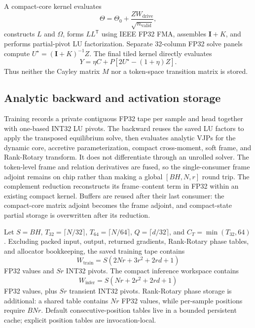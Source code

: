 \documentclass[10pt]{article}
\newcommand{\I}{\mathbf{I}}
\newcommand{\T}{\mathsf{T}}
\begin{document}
A compact-core kernel evaluates
\begin{equation}
    \Theta=\Theta_0+\frac{ZW_{\mathrm{drive}}}
                            {\sqrt{n_{\mathrm{valid}}}},
\end{equation}
constructs $L$ and $\Omega$, forms $LL^\T$ using IEEE FP32 FMA, assembles
$\I+K$, and performs partial-pivot LU factorization.  Separate 32-column FP32
solve panels compute $U^\star=(\I+K)^{-1}Z$.  The final tiled kernel directly
evaluates
\begin{equation}
    Y=\eta C+P[2U^\star-(1+\eta)Z].
\end{equation}
Thus neither the Cayley matrix $M$ nor a token-space transition matrix is
stored.

\subsection{Analytic backward and activation storage}

Training records a private contiguous FP32 tape per sample and head together
with one-based INT32 LU pivots.  The backward reuses the saved LU factors to
apply the transposed equilibrium solve, then evaluates analytic VJPs for the
dynamic core, accretive parameterization, compact cross-moment, soft frame, and
Rank-Rotary transform.  It does not differentiate through an unrolled solver.
The token-level frame and relation derivatives are fused, so the
single-consumer frame adjoint remains on chip rather than making a global
$[BH,N,r]$ round trip.  The complement reduction reconstructs its
frame--content term in FP32 within an existing compact kernel.  Buffers are
reused after their last consumer: the compact-core matrix adjoint becomes the
frame adjoint, and compact-state partial storage is overwritten after its
reduction.

Let $S=BH$, $T_{32}=\lceil N/32\rceil$,
$T_{64}=\lceil N/64\rceil$, $Q=\lceil d/32\rceil$, and
$C_T=\min(T_{32},64)$.  Excluding packed input, output, returned gradients,
Rank-Rotary phase tables, and allocator bookkeeping, the saved training tape
contains
\begin{equation}
    W_{\mathrm{train}}
    =S(2Nr+3r^2+2rd+1)
\label{eq:cuda-training-tape}
\end{equation}
FP32 values and $Sr$ INT32 pivots.  The compact inference workspace contains
\begin{equation}
    W_{\mathrm{infer}}
    =S(Nr+2r^2+2rd+1)
\label{eq:cuda-inference-workspace}
\end{equation}
FP32 values, plus $Sr$ transient INT32 pivots.
Rank-Rotary phase storage is additional: a shared table contains $Nr$ FP32
values, while per-sample positions require $BNr$.  Default consecutive-position
tables live in a bounded persistent cache; explicit position tables are
invocation-local.
\end{document}
